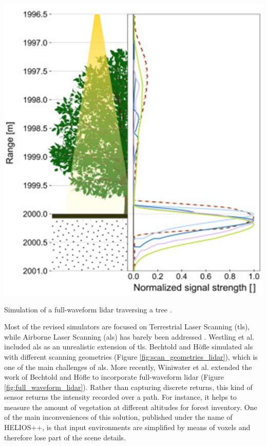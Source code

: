 \begin{marginfigure}[.0cm]
	\includegraphics{figs/context/waveform_lidar.png}
	\caption{Simulation of a full-waveform \acrshort{lidar} traversing a tree \cite{winiwarter_virtual_2022}.}
	\label{fig:full_waveform_lidar}
\end{marginfigure}
Most of the revised simulators are focused on Terrestrial Laser Scanning (\acrshort{tls}), while Airborne Laser Scanning (\acrshort{als}) has barely been addressed \cite{winiwarter_virtual_2022}. Westling et al. \cite{westling_simtreels_2020} included \acrshort{als} as an unrealistic extension of \acrshort{tls}. Bechtold and Höfle \cite{bechtold_helios_2016} simulated \acrshort{als} with different scanning geometries (Figure \ref{fig:scan_geometries_lidar}), which is one of the main challenges of \acrshort{als}. More recently, Winiwater et al. \cite{winiwarter_virtual_2022} extended the work of Bechtold and Höfle to incorporate full-waveform \acrshort{lidar} (Figure \ref{fig:full_waveform_lidar}). Rather than capturing discrete returns, this kind of sensor returns the intensity recorded over a path. For instance, it helps to measure the amount of vegetation at different altitudes for forest inventory. One of the main inconveniences of this solution, published under the name of HELIOS++, is that input environments are simplified by means of voxels and therefore lose part of the scene details.

